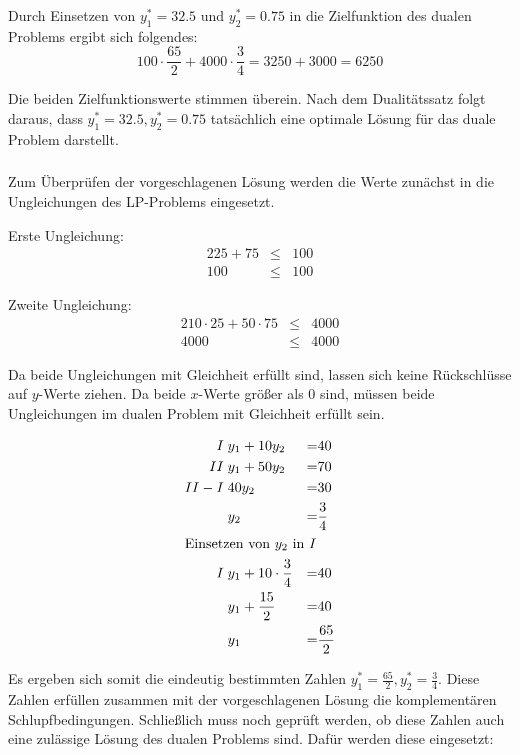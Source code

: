 \documentclass[10pt,a4paper,oneside,ngerman,numbers=noenddot]{scrartcl}
\begin{document}
			Durch Einsetzen von $y_{1}^{*} = 32.5$ und $y_{2}^{*} = 0.75$ in die Zielfunktion des dualen Problems ergibt sich folgendes:
			\[
				100 \cdot \frac{65}{2} + 4000 \cdot \frac{3}{4} = 3250 + 3000 = 6250
			\]
			
			Die beiden Zielfunktionswerte stimmen überein. Nach dem Dualitätssatz folgt daraus, dass $y_{1}^{*} = 32.5, y_{2}^{*} = 0.75$ tatsächlich eine optimale Lösung für das duale Problem darstellt.
		\subsubsection{} %
			Zum Überprüfen der vorgeschlagenen Lösung werden die Werte zunächst in die Ungleichungen des LP-Problems eingesetzt.
		
			Erste Ungleichung:
			\begin{alignat*}{2}
				25 + 75 &\leq & 100 \\
				100 &\leq & 100
			\end{alignat*}
		
			Zweite Ungleichung:
			\begin{alignat*}{2}
				10 \cdot 25 + 50 \cdot 75 &\leq & 4000 \\
				4000 &\leq & 4000
			\end{alignat*}
			
			Da beide Ungleichungen mit Gleichheit erfüllt sind, lassen sich keine Rückschlüsse auf $y$-Werte ziehen. Da beide $x$-Werte größer als $0$ sind, müssen beide Ungleichungen im dualen Problem mit Gleichheit erfüllt sein.
			
			\begin{alignat*}{2}
				I \;& y_{1} + 10y_{2} &=& 40 \\
				II \;& y_{1} + 50y_{2} &=& 70 \\
				II - I \;& 40y_{2} &=& 30 \\
				\;& y_{2} &=& \frac{3}{4} \\
				\intertext{Einsetzen von $y_{2}$ in $I$}
				I \;& y_{1} + 10 \cdot \frac{3}{4} &=& 40 \\
				\;& y_{1} + \frac{15}{2} &=& 40 \\
				\;& y_{1} &=& \frac{65}{2}
			\end{alignat*}
			
			Es ergeben sich somit die eindeutig bestimmten Zahlen $y_{1}^{*} = \frac{65}{2}, y_{2}^{*} = \frac{3}{4}$. Diese Zahlen erfüllen zusammen mit der vorgeschlagenen Lösung die komplementären Schlupfbedingungen.
			Schließlich muss noch geprüft werden, ob diese Zahlen auch eine zulässige Lösung des dualen Problems sind. Dafür werden diese eingesetzt:
\end{document}
